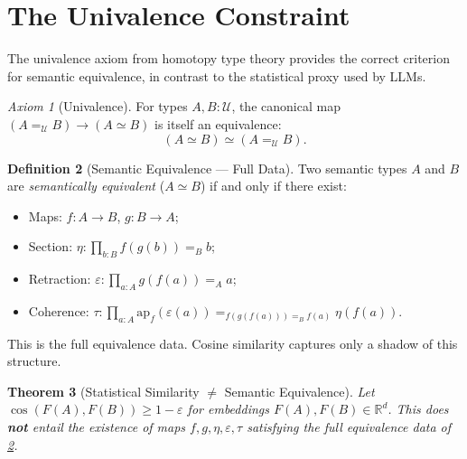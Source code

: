 \documentclass[11pt,a4paper]{article}
\theoremstyle{plain}
\newtheorem{theorem}{Theorem}[section]
\theoremstyle{definition}
\newtheorem{definition}[theorem]{Definition}
\theoremstyle{remark}
\newtheorem{axiom}[theorem]{Axiom}
\newcommand{\Type}{\mathcal{U}}
\newcommand{\R}{\mathbb{R}}
\begin{document}
\section{The Univalence Constraint}
\label{sec:univalence}

The univalence axiom from homotopy type theory provides the correct criterion for semantic equivalence, in contrast to the statistical proxy used by LLMs.

\begin{axiom}[Univalence]
\label{axiom:univalence}
For types $A, B : \Type$, the canonical map $(A =_{\Type} B) \to (A \simeq B)$ is itself an equivalence:
\begin{equation}
(A \simeq B) \simeq (A =_{\Type} B).
\end{equation}
\end{axiom}

\begin{definition}[Semantic Equivalence --- Full Data]
\label{def:sem-equiv}
Two semantic types $A$ and $B$ are \emph{semantically equivalent} ($A \simeq B$) if and only if there exist:
\begin{itemize}[nosep]
  \item Maps: $f: A \to B$, $g: B \to A$;
  \item Section: $\eta: \prod_{b:B} f(g(b)) =_B b$;
  \item Retraction: $\varepsilon: \prod_{a:A} g(f(a)) =_A a$;
  \item Coherence: $\tau: \prod_{a:A} \mathrm{ap}_f(\varepsilon(a)) =_{f(g(f(a))) =_B f(a)} \eta(f(a))$.
\end{itemize}
\end{definition}

This is the full equivalence data. Cosine similarity captures only a shadow of this structure.

\begin{theorem}[Statistical Similarity $\neq$ Semantic Equivalence]
\label{thm:univalence-gap}
Let $\cos(F(A), F(B)) \geq 1 - \varepsilon$ for embeddings $F(A), F(B) \in \R^d$. This does \textbf{not} entail the existence of maps $f, g, \eta, \varepsilon, \tau$ satisfying the full equivalence data of \cref{def:sem-equiv}.
\end{theorem}
\end{document}
